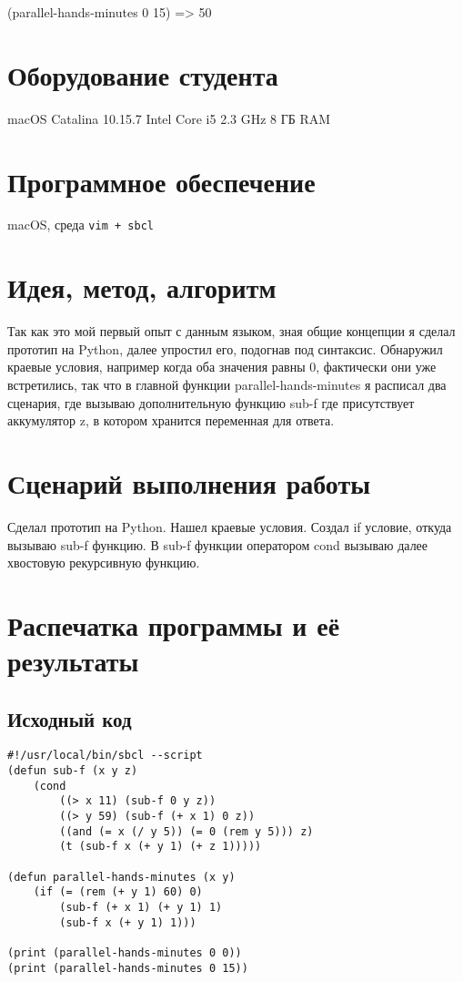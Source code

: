 \documentclass[15pt]{extarticle}
\begin{document}
(parallel-hands-minutes 0 15) => 50

\section{Оборудование студента}
macOS Catalina 10.15.7 Intel Core i5 2.3 GHz 8 ГБ RAM

\section{Программное обеспечение}
macOS, среда {\tt vim + sbcl}

\section{Идея, метод, алгоритм}
Так как это мой первый опыт с данным языком, зная общие концепции я сделал прототип на Python, далее упростил его, подогнав под синтаксис. Обнаружил краевые условия, например когда оба значения равны 0, фактически они уже встретились, так что в главной функции parallel-hands-minutes я расписал два сценария, где вызываю дополнительную функцию sub-f где присутствует аккумулятор z, в котором хранится переменная для ответа.

\section{Сценарий выполнения работы}
Сделал прототип на Python. Нашел краевые условия. Создал if условие, откуда вызываю sub-f функцию. В sub-f функции оператором cond вызываю далее хвостовую рекурсивную функцию.

\section{Распечатка программы и её результаты}

\subsection{Исходный код}

\begin{lstlisting}
#!/usr/local/bin/sbcl --script
(defun sub-f (x y z)
    (cond
        ((> x 11) (sub-f 0 y z)) 
        ((> y 59) (sub-f (+ x 1) 0 z)) 
        ((and (= x (/ y 5)) (= 0 (rem y 5))) z)
        (t (sub-f x (+ y 1) (+ z 1)))))

(defun parallel-hands-minutes (x y)  
    (if (= (rem (+ y 1) 60) 0)  
        (sub-f (+ x 1) (+ y 1) 1)  
        (sub-f x (+ y 1) 1)))

(print (parallel-hands-minutes 0 0)) 
(print (parallel-hands-minutes 0 15))
\end{lstlisting}
\end{document}
